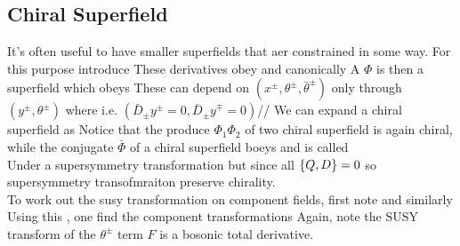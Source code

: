 \documentclass{article}
\begin{document}
\subsection{Chiral Superfield}
It's often useful to have smaller superfields that aer constrained in some way. For this purpose introduce 
These derivatives obey 
and canonically 
A  $\Phi$ is then a superfield which obeys 
These can depend on $(x^\pm, \theta^\pm, \bar{\theta}^\pm)$ only through $(y^\pm,\theta^\pm)$ where 
i.e. $(\bar{D}_\pm y^\pm = 0, \bar{D}_\pm y^\mp = 0)$//
We can expand a chiral superfield as 
Notice that the produce $\Phi_1 \Phi_2$ of two chiral superfield is again chiral, while the conjugate $\bar{\Phi}$ of a chiral superfield boeys 
and is called \\
Under a supersymmetry transformation 
\eq{
\Phi \to \Phi + \delta \Phi
}
but since all $\acomm[Q]{D} = 0$
so supersymmetry transofmraiton preserve chirality. \\
To work out the susy transformation on component fields, first note 
and similarly 
Using this , one find the component transformations 
Again, note the SUSY transform of the $\theta^\pm$ term $F$ is a bosonic total derivative. 
\end{document}
